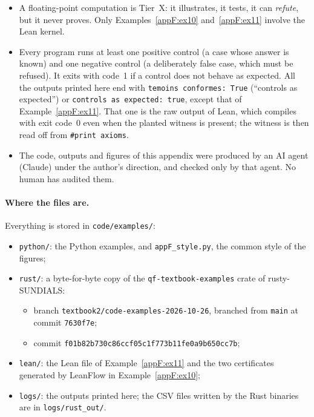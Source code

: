 \begin{warnbox}
\begin{itemize}
\item A floating-point computation is Tier~X: it illustrates, it tests, it can \emph{refute}, but it never proves.
Only Examples~\ref{appF:ex10} and~\ref{appF:ex11} involve the Lean kernel.
\item Every program runs at least one positive control (a case whose answer is known) and one negative control (a
deliberately false case, which must be refused). It exits with code~1 if a control does not behave as expected. All the
outputs printed here end with \texttt{temoins conformes: True} (``controls as expected'') or
\texttt{controls as expected: true}, except that of Example~\ref{appF:ex11}. That one is the raw output of Lean, which
compiles with exit code~0 even when the planted witness is present; the witness is then read off from
\texttt{\#print axioms}.
\item The code, outputs and figures of this appendix were produced by an AI agent (Claude) under the author's direction,
and checked only by that agent. No human has audited them.
\end{itemize}
\end{warnbox}

\paragraph{Where the files are.} Everything is stored in \texttt{code/examples/}:
\begin{itemize}
\item \texttt{python/}: the Python examples, and \texttt{appF\_style.py}, the common style of the figures;
\item \texttt{rust/}: a byte-for-byte copy of the \texttt{qf-textbook-examples} crate of rusty-SUNDIALS:
\begin{itemize}
\item branch \texttt{textbook2/code-examples-2026-10-26}, branched from \texttt{main} at commit \texttt{7630f7e};
\item commit \texttt{f01b82b730c86ccf05c1f773b11fe0a9b650cc7b};
\end{itemize}
\item \texttt{lean/}: the Lean file of Example~\ref{appF:ex11} and the two certificates generated by LeanFlow in
Example~\ref{appF:ex10};
\item \texttt{logs/}: the outputs printed here; the CSV files written by the Rust binaries are in
\texttt{logs/rust\_out/}.
\end{itemize}

